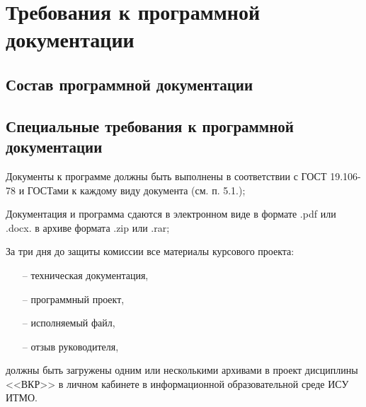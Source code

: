 \section{Требования к программной документации}

\subsection{Состав программной документации}



\subsection{Специальные требования к программной документации}

Документы к программе должны быть выполнены в соответствии с ГОСТ 19.106-78 и ГОСТами к каждому виду документа (см. п. 5.1.);

Документация и программа сдаются в электронном виде в формате .pdf или .docx. в архиве формата .zip или .rar;

За три дня до защиты комиссии все материалы курсового проекта:
\begin{itemize}
    \item[--] техническая документация,
    \item[--] программный проект,
    \item[--] исполняемый файл,
    \item[--] отзыв руководителя,
\end{itemize}
должны быть загружены одним или несколькими архивами в проект дисциплины <<ВКР>> в личном кабинете в информационной образовательной среде ИСУ ИТМО.
